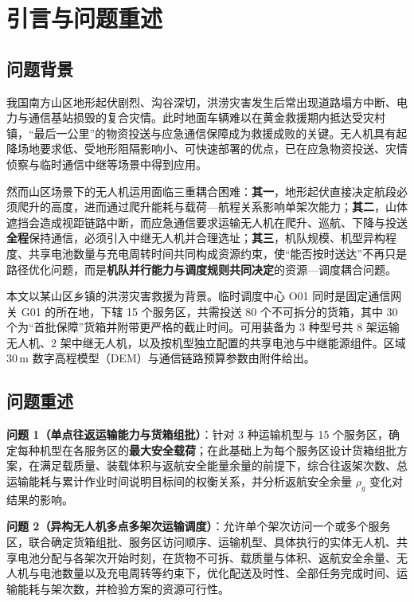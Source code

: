 \section{引言与问题重述}
\subsection{问题背景}

我国南方山区地形起伏剧烈、沟谷深切，洪涝灾害发生后常出现道路塌方中断、电力与通信基站损毁的复合灾情。此时地面车辆难以在黄金救援期内抵达受灾村镇，“最后一公里”的物资投送与应急通信保障成为救援成败的关键。无人机具有起降场地要求低、受地形阻隔影响小、可快速部署的优点，已在应急物资投送、灾情侦察与临时通信中继等场景中得到应用\cite{yang2026dronehumanitarian,zhang2021truckdrone,wang2014reliefrouting}。

然而山区场景下的无人机运用面临三重耦合困难：\textbf{其一}，地形起伏直接决定航段必须爬升的高度，进而通过爬升能耗与载荷—航程关系影响单架次能力；\textbf{其二}，山体遮挡会造成视距链路中断，而应急通信要求运输无人机在爬升、巡航、下降与投送\textbf{全程}保持通信，必须引入中继无人机并合理选址；\textbf{其三}，机队规模、机型异构程度、共享电池数量与充电周转时间共同构成资源约束，使“能否按时送达”不再只是路径优化问题，而是\textbf{机队并行能力与调度规则共同决定}的资源—调度耦合问题。

本文以某山区乡镇的洪涝灾害救援为背景。临时调度中心 O01 同时是固定通信网关 G01 的所在地，下辖 15 个服务区，共需投送 80 个不可拆分的货箱，其中 30 个为“首批保障”货箱并附带更严格的截止时间。可用装备为 3 种型号共 8 架运输无人机、2 架中继无人机，以及按机型独立配置的共享电池与中继能源组件。区域 30\,m 数字高程模型（DEM）与通信链路预算参数由附件给出。

\subsection{问题重述}

\noindent \textbf{问题 1（单点往返运输能力与货箱组批）}：针对 3 种运输机型与 15 个服务区，确定每种机型在各服务区的\textbf{最大安全载荷}；在此基础上为每个服务区设计货箱组批方案，在满足载质量、装载体积与返航安全能量余量的前提下，综合往返架次数、总运输能耗与累计作业时间说明目标间的权衡关系，并分析返航安全余量 $\rho_{g}$ 变化对结果的影响。

\noindent \textbf{问题 2（异构无人机多点多架次运输调度）}：允许单个架次访问一个或多个服务区，联合确定货箱组批、服务区访问顺序、运输机型、具体执行的实体无人机、共享电池分配与各架次开始时刻，在货物不可拆、载质量与体积、返航安全余量、无人机与电池数量以及充电周转等约束下，优化配送及时性、全部任务完成时间、运输能耗与架次数，并检验方案的资源可行性。

